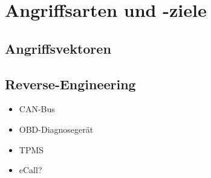 \section{Angriffsarten und -ziele}
\subsection{Angriffsvektoren}
\subsection{Reverse-Engineering}
\begin{itemize}
    \item CAN-Bus
    \item OBD-Diagnosegerät
    \item TPMS
    \item eCall?
\end{itemize}